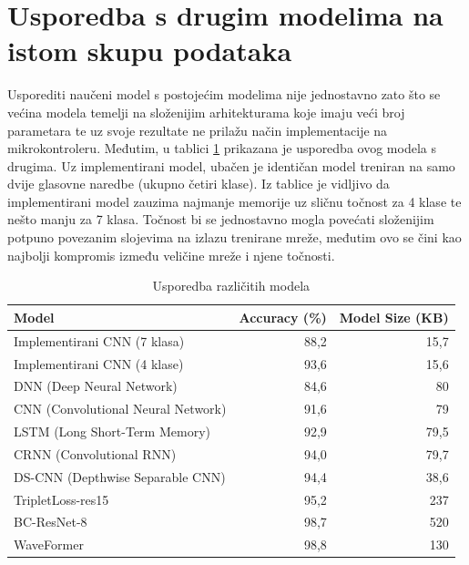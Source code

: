 \section{Usporedba s drugim modelima na istom skupu podataka}

Usporediti naučeni model s postojećim modelima nije jednostavno zato što
se većina modela temelji na složenijim arhitekturama koje imaju veći broj parametara te
uz svoje rezultate ne prilažu način implementacije na mikrokontroleru. Međutim,
u tablici \ref{tab:models} prikazana je usporedba ovog modela s drugima. Uz implementirani model,
ubačen je identičan model treniran na samo dvije glasovne naredbe (ukupno četiri klase).
Iz tablice je vidljivo da implementirani model zauzima najmanje memorije uz sličnu točnost za 4 klase te
nešto manju za 7 klasa. Točnost bi se jednostavno mogla povećati složenijim potpuno povezanim
slojevima na izlazu trenirane mreže, međutim ovo se čini kao najbolji kompromis između veličine
mreže i njene točnosti.

\newpage

\begin{table}[htb]
    \centering
    \begin{tabular}{|l|r|r|}
        \hline
        \textbf{Model} & \textbf{Accuracy (\%)} & \textbf{Model Size (KB)} \\ \hline
        Implementirani CNN (7 klasa) & 88,2 & 15,7 \\ 
        Implementirani CNN (4 klase) & 93,6 & 15,6 \\ 
        DNN (Deep Neural Network)          \cite{zhang2017hello} & 84,6 & 80 \\
        CNN (Convolutional Neural Network) \cite{zhang2017hello} & 91,6 & 79 \\
        LSTM (Long Short-Term Memory)      \cite{zhang2017hello} & 92,9 & 79,5 \\
        CRNN (Convolutional RNN)           \cite{zhang2017hello} & 94,0 & 79,7 \\
        DS-CNN (Depthwise Separable CNN)   \cite{zhang2017hello} & 94,4 & 38,6  \\
        TripletLoss-res15 \cite{triplet} & 95,2 & 237 \\
        BC-ResNet-8 \cite{res} & 98,7 & 520 \\
        WaveFormer \cite{waveformer} & 98,8 & 130  \\
        \hline
    \end{tabular}
    \caption{Usporedba različitih modela}
    \label{tab:models}
\end{table}
